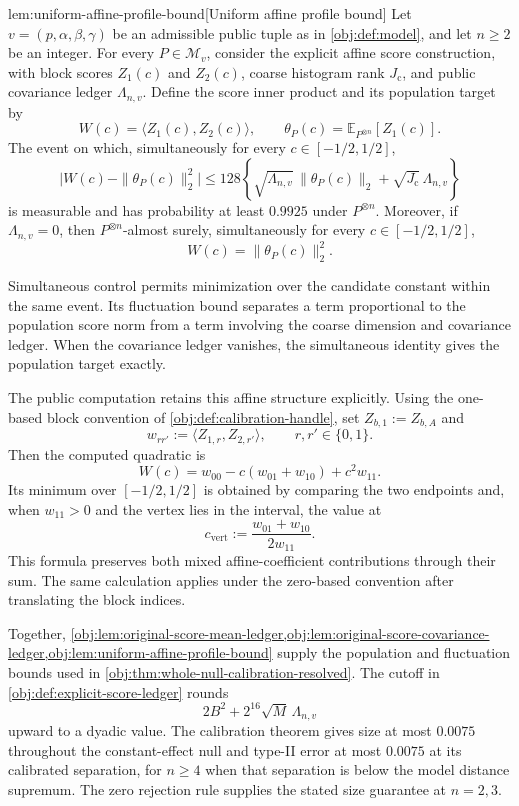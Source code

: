 \begin{lemmav}{lem:uniform-affine-profile-bound}[Uniform affine profile bound]
Let \(v=(p,\alpha,\beta,\gamma)\) be an admissible public tuple as in \cref{obj:def:model}, and let \(n\ge 2\) be an integer. For every \(P\in\mathcal M_v\), consider the explicit affine score construction, with block scores \(Z_1(c)\) and \(Z_2(c)\), coarse histogram rank \(J_{\mathrm c}\), and public covariance ledger \(\Lambda_{n,v}\). Define the score inner product and its population target by
\[
W(c)=\langle Z_1(c),Z_2(c)\rangle,
\qquad
\theta_P(c)=\mathbb E_{P^{\otimes n}}[Z_1(c)].
\]
The event on which, simultaneously for every \(c\in[-1/2,1/2]\),
\[
\bigl|W(c)-\|\theta_P(c)\|_2^2\bigr|
\le
128\left\{
\sqrt{\Lambda_{n,v}}\,\|\theta_P(c)\|_2
+\sqrt{J_{\mathrm c}}\,\Lambda_{n,v}
\right\}
\]
is measurable and has probability at least \(0.9925\) under \(P^{\otimes n}\). Moreover, if \(\Lambda_{n,v}=0\), then \(P^{\otimes n}\)-almost surely, simultaneously for every \(c\in[-1/2,1/2]\),
\[
W(c)=\|\theta_P(c)\|_2^2.
\]
\end{lemmav}

Simultaneous control permits minimization over the candidate constant within the same event. Its fluctuation bound separates a term proportional to the population score norm from a term involving the coarse dimension and covariance ledger. When the covariance ledger vanishes, the simultaneous identity gives the population target exactly.

The public computation retains this affine structure explicitly. Using the one-based block convention of \cref{obj:def:calibration-handle}, set \(Z_{b,1}:=Z_{b,A}\) and
\[
w_{rr'}:=\langle Z_{1,r},Z_{2,r'}\rangle,
\qquad r,r'\in\{0,1\}.
\]
Then the computed quadratic is
\[
W(c)=w_{00}-c(w_{01}+w_{10})+c^2w_{11}.
\]
Its minimum over \([-1/2,1/2]\) is obtained by comparing the two endpoints and, when \(w_{11}>0\) and the vertex lies in the interval, the value at
\[
c_{\mathrm{vert}}:=\frac{w_{01}+w_{10}}{2w_{11}}.
\]
This formula preserves both mixed affine-coefficient contributions through their sum. The same calculation applies under the zero-based convention after translating the block indices.

Together, \cref{obj:lem:original-score-mean-ledger,obj:lem:original-score-covariance-ledger,obj:lem:uniform-affine-profile-bound} supply the population and fluctuation bounds used in \cref{obj:thm:whole-null-calibration-resolved}. The cutoff in \cref{obj:def:explicit-score-ledger} rounds
\[
2B^2+2^{16}\sqrt M\,\Lambda_{n,v}
\]
upward to a dyadic value. The calibration theorem gives size at most \(0.0075\) throughout the constant-effect null and type-II error at most \(0.0075\) at its calibrated separation, for \(n\ge4\) when that separation is below the model distance supremum. The zero rejection rule supplies the stated size guarantee at \(n=2,3\).

